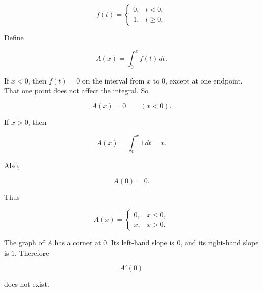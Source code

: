 \[
f(t)=
\begin{cases}
0, & t<0,\\
1, & t\ge0.
\end{cases}
\]

Define

\[
A(x)=\int_0^x f(t)\,dt.
\]

If \(x<0\), then \(f(t)=0\) on the interval from \(x\) to \(0\), except at one endpoint.
That one point does not affect the integral.  So

\[
A(x)=0
\qquad (x<0).
\]

If \(x>0\), then

\[
A(x)=\int_0^x 1\,dt=x.
\]

Also,

\[
A(0)=0.
\]

Thus

\[
A(x)=
\begin{cases}
0, & x\le0,\\
x, & x>0.
\end{cases}
\]

The graph of \(A\) has a corner at \(0\).  Its left-hand slope is \(0\), and its right-hand
slope is \(1\).  Therefore

\[
A'(0)
\]

does not exist.

